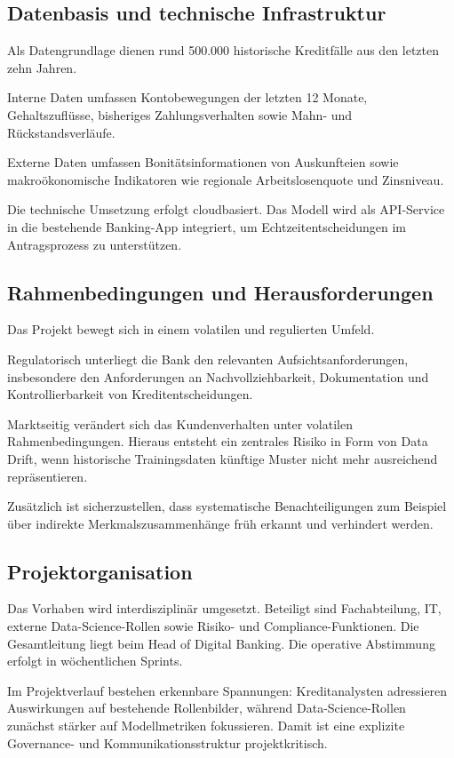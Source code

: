 \subsection{Datenbasis und technische Infrastruktur}
Als Datengrundlage dienen rund 500.000 historische Kreditfälle
aus den letzten zehn Jahren.

Interne Daten umfassen Kontobewegungen der letzten 12 Monate,
Gehaltszuflüsse, bisheriges Zahlungsverhalten
sowie Mahn- und Rückstandsverläufe.

Externe Daten umfassen Bonitätsinformationen von Auskunfteien
sowie makroökonomische Indikatoren
wie regionale Arbeitslosenquote und Zinsniveau.

Die technische Umsetzung erfolgt cloudbasiert.
Das Modell wird als API-Service in die bestehende Banking-App integriert,
um Echtzeitentscheidungen im Antragsprozess zu unterstützen.

\subsection{Rahmenbedingungen und Herausforderungen}
Das Projekt bewegt sich in einem volatilen und regulierten Umfeld.

Regulatorisch unterliegt die Bank den relevanten Aufsichtsanforderungen,
insbesondere den Anforderungen an Nachvollziehbarkeit,
Dokumentation und Kontrollierbarkeit von Kreditentscheidungen.

Marktseitig verändert sich das Kundenverhalten
unter volatilen Rahmenbedingungen.
Hieraus entsteht ein zentrales Risiko in Form von Data Drift,
wenn historische Trainingsdaten künftige Muster
nicht mehr ausreichend repräsentieren.

Zusätzlich ist sicherzustellen,
dass systematische Benachteiligungen
zum Beispiel über indirekte Merkmalszusammenhänge
früh erkannt und verhindert werden.

\subsection{Projektorganisation}
Das Vorhaben wird interdisziplinär umgesetzt.
Beteiligt sind Fachabteilung, IT, externe Data-Science-Rollen
sowie Risiko- und Compliance-Funktionen.
Die Gesamtleitung liegt beim Head of Digital Banking.
Die operative Abstimmung erfolgt in wöchentlichen Sprints.

Im Projektverlauf bestehen erkennbare Spannungen:
Kreditanalysten adressieren Auswirkungen auf bestehende Rollenbilder,
während Data-Science-Rollen zunächst stärker
auf Modellmetriken fokussieren.
Damit ist eine explizite Governance- und Kommunikationsstruktur
projektkritisch.

